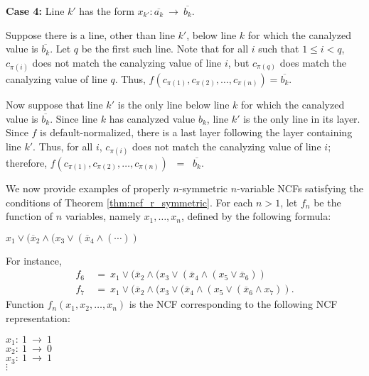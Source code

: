 \medskip

\noindent
{\bf Case 4:} Line $k'$ has the form $x_{k'} : \overline{a_k} ~\longrightarrow~ 
              \overline{b_k}$. 

\smallskip

Suppose there is a line, other than line $k'$, below line $k$ for
which the canalyzed value is $\overline{b_k}$.  Let $q$ be the
first such line.  Note that for all $i$ such that $1 \leq i < q$,
$c_{\pi(i)}$ does not match the canalyzing value of line $i$, but
$c_{\pi(q)}$ does match the canalyzing value of line $q$.  Thus,
$f(c_{\pi(1)}, c_{\pi(2)}, \ldots, c_{\pi(n)}) = \overline{b_k}$.

Now suppose that line $k'$ is the only line below line $k$ for which
the canalyzed value is $\overline{b_k}$.  Since line $k$ has
canalyzed value $b_k$, line $k'$ is the only line in its layer.
Since $f$ is default-normalized, there is a last layer following the layer
containing line $k'$.  Thus, for all $i$, $c_{\pi(i)}$ does not
match the canalyzing value of line $i$; therefore, 
$f(c_{\pi(1)}, c_{\pi(2)}, \ldots, c_{\pi(n)})$ ~=~ $\overline{b_k}$.  \QED

\medskip

\noindent
We now provide
examples of properly $n$-symmetric $n$-variable NCFs satisfying the
conditions of Theorem \ref{thm:ncf_r_symmetric}.
For each $n > 1$, let $f_n$ be the function of $n$ variables, namely
$x_1, \ldots, x_n$, defined by the following formula:

\smallskip

\hspace*{0.5in} $x_1 \vee (\overline{x}_2 \wedge ( x_3 \vee (\overline{x}_4 \wedge (\cdots ))$

\smallskip

\noindent
For instance,
\begin{align*}
f_6 &~=~  x_1 \vee (\overline{x}_2 \wedge (x_3 \vee (\overline{x}_4 \wedge 
      (x_5 \vee \overline{x}_6)) \\
f_7 &~=~  x_1 \vee (\overline{x}_2 \wedge (x_3 \vee (\overline{x}_4 \wedge (x_5 
          \vee (\overline{x}_6 \wedge  x_7)).
\end{align*}
Function $f_n(x_1, x_2, \ldots, x_n)$ is the NCF corresponding to
the following NCF representation:

\medskip

\noindent
\hspace*{0.25in}
$x_1:~ 1 ~\longrightarrow~ 1$ \\
\hspace*{0.25in}
$x_2:~ 1 ~\longrightarrow~ 0$ \\
\hspace*{0.25in}
$x_3:~ 1 ~\longrightarrow~ 1$ \\
\hspace*{0.75in}
$\vdots$ 

